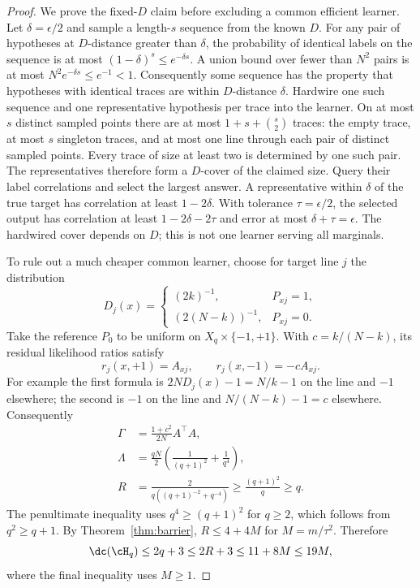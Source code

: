 \begin{proof}
We prove the fixed-$D$ claim before excluding a common efficient learner. Let $\delta=\epsilon/2$ and sample a length-$s$ sequence from the known $D$. For any pair of hypotheses at $D$-distance greater than $\delta$, the probability of identical labels on the sequence is at most $(1-\delta)^s\leq e^{-\delta s}$. A union bound over fewer than $N^2$ pairs is at most $N^2e^{-\delta s}\leq e^{-1}<1$. Consequently some sequence has the property that hypotheses with identical traces are within $D$-distance $\delta$. Hardwire one such sequence and one representative hypothesis per trace into the learner. On at most $s$ distinct sampled points there are at most $1+s+\binom{s}{2}$ traces: the empty trace, at most $s$ singleton traces, and at most one line through each pair of distinct sampled points. Every trace of size at least two is determined by one such pair. The representatives therefore form a $D$-cover of the claimed size. Query their label correlations and select the largest answer. A representative within $\delta$ of the true target has correlation at least $1-2\delta$. With tolerance $\tau=\epsilon/2$, the selected output has correlation at least $1-2\delta-2\tau$ and error at most $\delta+\tau=\epsilon$. The hardwired cover depends on $D$; this is not one learner serving all marginals.

To rule out a much cheaper common learner, choose for target line $j$ the distribution
\[
 D_j(x)=\begin{cases}(2k)^{-1},&P_{xj}=1,\\[1mm]
 (2(N-k))^{-1},&P_{xj}=0.
 \end{cases}
\]
Take the reference $P_0$ to be uniform on $X_q\times\{-1,+1\}$. With $c=k/(N-k)$, its residual likelihood ratios satisfy
\[
 r_j(x,+1)=A_{xj},\qquad r_j(x,-1)=-cA_{xj}.
\]
For example the first formula is $2N D_j(x)-1=N/k-1$ on the line and $-1$ elsewhere; the second is $-1$ on the line and $N/(N-k)-1=c$ elsewhere. Consequently
\begin{align*}
 \Gamma&=\frac{1+c^2}{2N}A^\top A,\\
 \Lambda&=\frac{qN}{2}\left(\frac1{(q+1)^2}+\frac1{q^4}\right),\\
 R&=\frac{2}{q((q+1)^{-2}+q^{-4})}\geq\frac{(q+1)^2}{q}\geq q.
\end{align*}
The penultimate inequality uses $q^4\geq(q+1)^2$ for $q\geq2$, which follows from $q^2\geq q+1$. By Theorem~\ref{thm:barrier}, $R\leq4+4M$ for $M=m/\tau^2$. Therefore
\[
 \dc(\cH_q)\leq2q+3\leq2R+3\leq11+8M\leq19M,
\]
where the final inequality uses $M\geq1$.
\end{proof}

